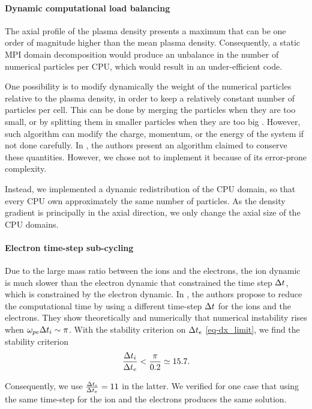 \paragraph{Dynamic computational load balancing\\}
The axial profile of the plasma density presents a maximum that can be one order of magnitude higher than the mean plasma density.
Consequently, a static MPI domain decomposition would produce an unbalance in the number of numerical particles per CPU, which would result in an under-efficient code.

One possibility is to modify dynamically the weight of the numerical particles relative to the plasma density, in order to keep a relatively constant number of particles per cell.
This can be done by merging the particles when they are too small, or by splitting them in smaller particles when they are too big \citep{shon2001,teunissen2014}.
However, such algorithm can modify the charge, momentum, or the energy of the system if not done carefully.
In \citet{vranic2015}, the authors present an algorithm claimed to conserve these quantities.
However, we chose not to implement it because of its error-prone complexity.

Instead, we implemented a dynamic redistribution of the CPU domain, so that every CPU own approximately the same number of particles.
As the density gradient is principally in the axial direction, we only change the axial size of the CPU domains.

\paragraph{Electron time-step sub-cycling\\}
Due to the large mass ratio between the  ions and the electrons, the ion dynamic is much slower than the electron dynamic that constrained the time step  $\Delta t$, which is constrained by the electron dynamic.
In \citet{adam1982}, the authors propose to reduce the computational time by using a different time-step $\Delta t$ for the ions and the electrons.
They show theoretically and numerically that numerical instability rises when $\omega_{pe} \Delta t_i  \sim \pi$.
With the stability criterion on $\Delta t_e$ \cref{eq-dx_limit}, we find the stability criterion 
\begin{equation} \label{eq-subcycling_criterion}
  \frac{\Delta t_i}{\Delta t_e} < \frac{\pi}{0.2} \simeq 15.7.
\end{equation}

Consequently, we use $\frac{\Delta t_i}{\Delta t_e} = 11$ in the latter.
We verified for one case that using the same time-step for the ion and the electrons produces the same solution.


